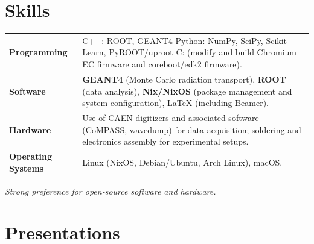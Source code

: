 \documentclass[11pt,a4paper,sans]{moderncv}
\begin{document}
\section{Skills}
\begin{tabular}{ @{} >{\bfseries}l @{\hspace{2ex}} p{} }
	Programming       &
	C++: ROOT, GEANT4 \linebreak
	Python: NumPy, SciPy, Scikit-Learn, PyROOT/uproot \linebreak
	C: (modify and build Chromium EC firmware and coreboot/edk2 firmware). \\

	Software          &
	\textbf{GEANT4} (Monte Carlo radiation transport),
	\textbf{ROOT} (data analysis),
	\textbf{Nix/NixOS} (package management and system configuration),
	\LaTeX{} (including Beamer).                                           \\

	Hardware          &
	Use of CAEN digitizers and associated software (CoMPASS, wavedump) for data acquisition;
	soldering and electronics assembly for experimental setups.            \\

	Operating Systems &
	Linux (NixOS, Debian/Ubuntu, Arch Linux), macOS.                       \\
\end{tabular}

\vspace{0.5em}

\textit{Strong preference for open-source software and hardware.}
%
\section{Presentations}
\begin{etaremune}
	\item {}
	\item {}
	\item {}
	\item {}
\end{etaremune}
\end{document}
